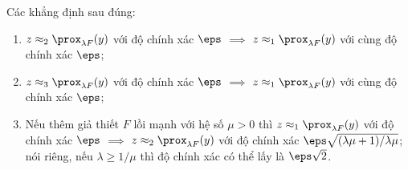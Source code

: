 \begin{proposition}
\label{prop:relations}
Các khẳng định sau đúng:
\begin{enumerate}
  \item $z\approx_2\prox_{\lambda F}(y)$ với độ chính xác $\eps$
        $\implies$ $z\approx_1\prox_{\lambda F}(y)$ với cùng độ chính
        xác $\eps$;
  \item $z\approx_3\prox_{\lambda F}(y)$ với độ chính xác $\eps$
        $\implies$ $z\approx_1\prox_{\lambda F}(y)$ với cùng độ chính
        xác $\eps$;
  \item Nếu thêm giả thiết $F$ lồi mạnh với hệ số $\mu>0$ thì
        $z\approx_1\prox_{\lambda F}(y)$ với độ chính xác $\eps$
        $\implies$ $z\approx_2\prox_{\lambda F}(y)$ với độ chính xác
        $\eps\sqrt{(\lambda\mu+1)/\lambda\mu}$; nói riêng, nếu
        $\lambda\ge 1/\mu$ thì độ chính xác có thể lấy là $\eps\sqrt{2}$.
\end{enumerate}
\end{proposition}
